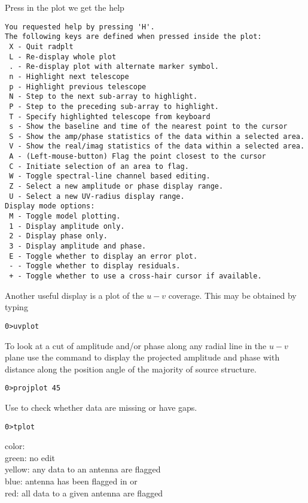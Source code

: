 \documentclass[a4paper,11pt]{article}
\begin{document}
\normalsize
Press  in the plot we get the help
\scriptsize
\begin{lstlisting}
You requested help by pressing 'H'.
The following keys are defined when pressed inside the plot:
 X - Quit radplt
 L - Re-display whole plot
 . - Re-display plot with alternate marker symbol.
 n - Highlight next telescope
 p - Highlight previous telescope
 N - Step to the next sub-array to highlight.
 P - Step to the preceding sub-array to highlight.
 T - Specify highlighted telescope from keyboard
 s - Show the baseline and time of the nearest point to the cursor
 S - Show the amp/phase statistics of the data within a selected area.
 V - Show the real/imag statistics of the data within a selected area.
 A - (Left-mouse-button) Flag the point closest to the cursor
 C - Initiate selection of an area to flag.
 W - Toggle spectral-line channel based editing.
 Z - Select a new amplitude or phase display range.
 U - Select a new UV-radius display range.
Display mode options:
 M - Toggle model plotting.
 1 - Display amplitude only.
 2 - Display phase only.
 3 - Display amplitude and phase.
 E - Toggle whether to display an error plot.
 - - Toggle whether to display residuals.
 + - Toggle whether to use a cross-hair cursor if available.
\end{lstlisting}
\normalsize
Another useful display is a plot of the $u-v$ coverage. This may be obtained by typing
\begin{lstlisting}
0>uvplot
\end{lstlisting}

To look at a cut of amplitude and/or phase along any radial line in the $u-v$ plane use the command  to display the projected amplitude and phase with distance along the position angle of the majority of source structure.
\begin{lstlisting}
0>projplot 45
\end{lstlisting}
\par Use  to check whether data are missing or have gaps.
\begin{lstlisting}
0>tplot
\end{lstlisting}
\par color:\\
green: no edit\\
yellow: any data to an antenna are flagged\\
blue: antenna has been flagged  in  or \\
red: all data to a given antenna are flagged
\end{document}
